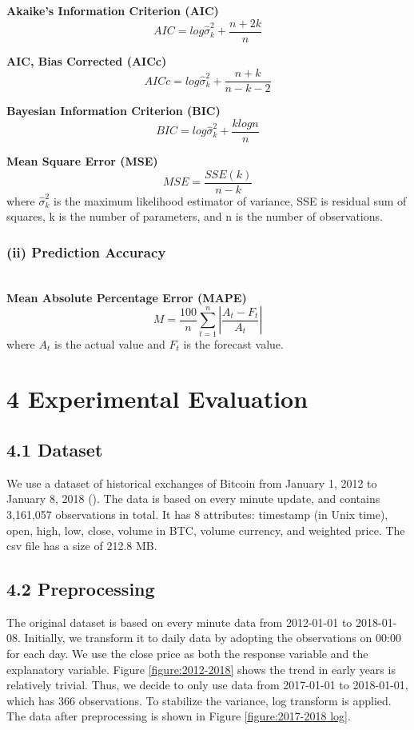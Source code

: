 \documentclass[letterpaper]{article} %
\begin{document}
\textbf{Akaike’s Information Criterion (AIC)}
$$AIC = log\hat{\sigma}_k^2+\frac{n+2k}{n}$$

\textbf{AIC, Bias Corrected (AICc)}
$$AICc = log\hat{\sigma}_k^2+\frac{n+k}{n-k-2}$$

\textbf{Bayesian Information Criterion (BIC)}
$$BIC = log\hat{\sigma}_k^2+\frac{klog n}{n}$$

\textbf{Mean Square Error (MSE)}
$$MSE = \frac{SSE(k)}{n-k}$$
where $\hat{\sigma}_k^2$ is the maximum likelihood estimator of variance, SSE is residual sum of squares, k is the number of parameters, and n is the number of observations.

\subsubsection*{(ii) Prediction Accuracy}~\\

\textbf{Mean Absolute Percentage Error (MAPE)}
$$M = \frac{100}{n}\sum_{t=1}^{n}|\frac{A_t-F_t}{A_t}|$$
where $A_t$ is the actual value and $F_t$ is the forecast value.

\section{4 Experimental Evaluation}
\subsection{4.1 Dataset}
We use a dataset of historical exchanges of Bitcoin from January 1, 2012 to January 8, 2018 (\citeauthor{bitcoin_set}). The data is based on every minute update, and contains 3,161,057 observations in total. It has 8 attributes: timestamp (in Unix time), open, high, low, close, volume in BTC, volume currency, and weighted price. The csv file has a size of 212.8 MB.


\subsection{4.2 Preprocessing}
The original dataset is based on every minute data from 2012-01-01 to 2018-01-08. Initially, we transform it to daily data by adopting the observations on 00:00 for each day. We use the close price as both the response variable and the explanatory variable. Figure \ref{figure:2012-2018} shows the trend in early years is relatively trivial. Thus, we decide to only use data from 2017-01-01 to 2018-01-01, which has 366 observations. To stabilize the variance, log transform is applied. The data after preprocessing is shown in Figure \ref{figure:2017-2018 log}.
\end{document}

